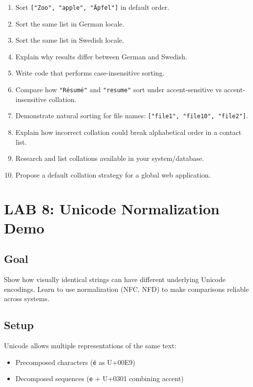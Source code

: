 \documentclass[
  letterpaper,
  DIV=11,
  numbers=noendperiod]{scrreprt}
\providecommand{\tightlist}{%
  \setlength{\itemsep}{0pt}\setlength{\parskip}{0pt}}
\begin{document}
\begin{enumerate}
\def\labelenumi{\arabic{enumi}.}
\tightlist
\item
  Sort \texttt{{[}"Zoo",\ "apple",\ "Äpfel"{]}} in default order.
\item
  Sort the same list in German locale.
\item
  Sort the same list in Swedish locale.
\item
  Explain why results differ between German and Swedish.
\item
  Write code that performs case-insensitive sorting.
\item
  Compare how \texttt{"Résumé"} and \texttt{"resume"} sort under
  accent-sensitive vs accent-insensitive collation.
\item
  Demonstrate natural sorting for file names:
  \texttt{{[}"file1",\ "file10",\ "file2"{]}}.
\item
  Explain how incorrect collation could break alphabetical order in a
  contact list.
\item
  Research and list collations available in your system/database.
\item
  Propose a default collation strategy for a global web application.
\end{enumerate}

\section{LAB 8: Unicode Normalization
Demo}\label{lab-8-unicode-normalization-demo}

\subsection{Goal}\label{goal-7}

Show how visually identical strings can have different underlying
Unicode encodings. Learn to use normalization (NFC, NFD) to make
comparisons reliable across systems.

\subsection{Setup}\label{setup-7}

Unicode allows multiple representations of the same text:

\begin{itemize}
\tightlist
\item
  Precomposed characters (\texttt{é} as U+00E9)
\item
  Decomposed sequences (\texttt{e} + U+0301 combining accent)
\end{itemize}
\end{document}
